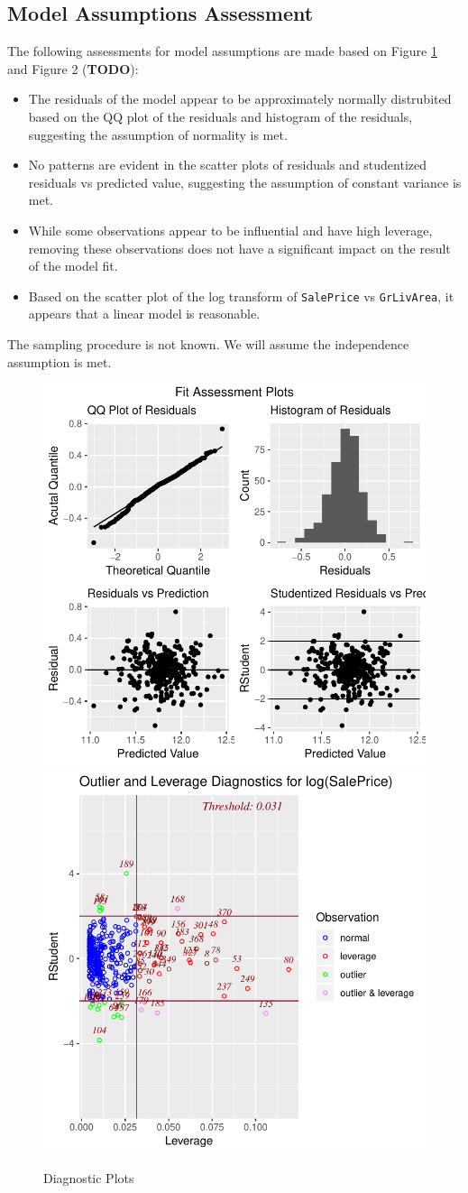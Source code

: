 \documentclass[american,]{article}
\providecommand{\tightlist}{%
  \setlength{\itemsep}{0pt}\setlength{\parskip}{0pt}}
\begin{document}
\hypertarget{model-assumptions-assessment}{%
\subsection{Model Assumptions
Assessment}\label{model-assumptions-assessment}}

The following assessments for model assumptions are made based on Figure
\ref{fig:diag-plots} and Figure 2 (\textbf{TODO}):

\begin{itemize}
\tightlist
\item
  The residuals of the model appear to be approximately normally
  distrubited based on the QQ plot of the residuals and histogram of the
  residuals, suggesting the assumption of normality is met.
\item
  No patterns are evident in the scatter plots of residuals and
  studentized residuals vs predicted value, suggesting the assumption of
  constant variance is met.
\item
  While some observations appear to be influential and have high
  leverage, removing these observations does not have a significant
  impact on the result of the model fit.
\item
  Based on the scatter plot of the log transform of \texttt{SalePrice}
  vs \texttt{GrLivArea}, it appears that a linear model is reasonable.
\end{itemize}

The sampling procedure is not known. We will assume the independence
assumption is met.

\begin{figure}[htbp]

{\centering \includegraphics[width=0.45\linewidth]{HousePriceRegressionAnalysis_files/figure-latex/diag-plots-1} \includegraphics[width=0.45\linewidth]{HousePriceRegressionAnalysis_files/figure-latex/diag-plots-2} 

}

\caption{Diagnostic Plots}\label{fig:diag-plots}
\end{figure}
\end{document}
